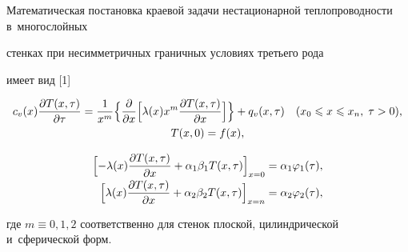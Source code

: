 Математическая постановка краевой задачи нестационарной теплопроводности в~многослойных

стенках при несимметричных граничных условиях третьего рода

имеет вид [1]

\begin{gather}

\label{av:s:eq4}

c_v (x)\frac{\partial T(x, \tau )}{\partial \tau }=

\frac{1}{x^m}

\Bigl\{

\frac{\partial}{\partial x}\Bigl[

\lambda (x) x^m\frac{\partial T (x, \tau)}{\partial x}

\Bigr]

\Bigr\}+q_v (x, \tau )

\quad

(x_0 \leqslant x\leqslant x_n, \; \tau >0),

\\

\label{av:s:eq5}

T(x, 0)=f(x),

\end{gather}

\begin{equation}

\label{av:s:eq6}

\begin{array}{r}

 \Bigl[ \displaystyle

-\lambda (x) \frac{\partial T(x,\tau )} {\partial x}+\alpha _1 \beta _1 T(x, \tau )  \Bigr]_{x=0} =\alpha _1 \varphi_1 (\tau ), \vspace{1mm} \\

\displaystyle

 \Bigl[ \displaystyle

\lambda (x) \frac{\partial T(x, \tau)} {\partial x} +\alpha _2 \beta _2 T(x, \tau ) \Bigr]_{x=n} =\alpha _2 \varphi _2 (\tau ),

 \end{array}

\end{equation}

где $m \equiv 0, 1, 2$ соответственно для стенок плоской, цилиндрической и~сферической форм.







